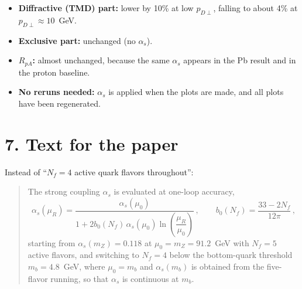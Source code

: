 \documentclass[12pt]{article}
\begin{document}
\begin{itemize}
\item \textbf{Diffractive (TMD) part:} lower by 10\% at low $p_{D\perp}$, falling to about 4\% at
  $p_{D\perp}\approx10$~GeV.
\item \textbf{Exclusive part:} unchanged (no $\alpha_s$).
\item \textbf{$R_{pA}$:} almost unchanged, because the same $\alpha_s$ appears in the Pb result and in
  the proton baseline.
\item \textbf{No reruns needed:} $\alpha_s$ is applied when the plots are made, and all plots have been
  regenerated.
\end{itemize}

\section*{7. Text for the paper}

Instead of ``$N_f=4$ active quark flavors throughout'':
\begin{quote}
The strong coupling $\alpha_s$ is evaluated at one-loop accuracy,
\[
  \alpha_s(\mu_R)=\frac{\alpha_s(\mu_0)}{1+2b_0(N_f)\,\alpha_s(\mu_0)\ln\left(\dfrac{\mu_R}{\mu_0}\right)}\,,
  \qquad b_0(N_f)=\frac{33-2N_f}{12\pi}\,,
\]
starting from $\alpha_s(m_Z)=0.118$ at $\mu_0=m_Z=91.2$~GeV with $N_f=5$ active flavors, and
switching to $N_f=4$ below the bottom-quark threshold $m_b=4.8$~GeV, where $\mu_0=m_b$ and
$\alpha_s(m_b)$ is obtained from the five-flavor running, so that $\alpha_s$ is continuous at $m_b$.
\end{quote}
\end{document}
